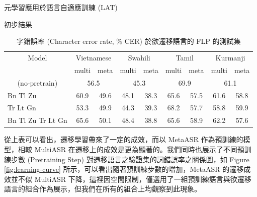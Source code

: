 \documentclass[12pt,UTF8,fntef]{article}
\begin{document}
\begin{section}{元學習應用於語言自適應訓練 (LAT)}
    \begin{subsection}{初步結果}
      \begin{table}[thp!]
\centering
\caption{字錯誤率 (Character error rate, \si{\percent} CER) 於欲遷移語言的 FLP 的測試集}
\label{tab:flp-table}
\begin{tabular}{@{}ccccccccc@{}}
\toprule
Model                                    & \multicolumn{2}{c}{Vietnamese}                         & \multicolumn{2}{c}{Swahili}                        & \multicolumn{2}{c}{Tamil}                        & \multicolumn{2}{c}{Kurmanji} \\

                                         & multi           & meta                                & multi           & meta                                & multi           & meta                                & multi           & meta           \\ \midrule
\multicolumn{1}{c|}{(no-pretrain)}                   & \multicolumn{2}{c|}{56.5}                    & \multicolumn{2}{c|}{45.3}                    & \multicolumn{2}{c|}{69.9}          & \multicolumn{2}{c}{61.1}                    \\

\multicolumn{1}{l|}{Bn Tl Zu}   &    60.9      & \multicolumn{1}{c|}{49.6}          & 48.1          & \multicolumn{1}{c|}{38.3}          & 65.6          & \multicolumn{1}{c|}{57.5}          & 61.6          & 58.8          \\
\multicolumn{1}{l|}{ \qquad \qquad Tr Lt Gn} & 53.3          & \multicolumn{1}{c|}{49.9}          & 44.3          & \multicolumn{1}{c|}{39.3}          & 68.2          & \multicolumn{1}{c|}{57.7}          & 58.8          & 59.9          \\
\multicolumn{1}{l|}{Bn Tl Zu Tr Lt Gn}           & 65.6          & \multicolumn{1}{c|}{50.1}          & 48.4          & \multicolumn{1}{c|}{38.8}          & 65.6          & \multicolumn{1}{c|}{58.9}          & 62.2          & 57.6          \\ \bottomrule
\end{tabular}
\end{table}

從上表可以看出，遷移學習帶來了一定的成效，而以 MetaASR 作為預訓練的模型，相較 MultiASR 在遷移上的成效是更為顯著的。我們同時也展示了不同預訓練步數 (Pretraining Step) 對遷移語言之驗證集的詞錯誤率之關係圖，如 Figure \ref{fig:learning-curve} 所示，可以看出隨著預訓練步數的增加，MetaASR 的遷移成效並不似 MultiASR 下降，這裡因空間限制，僅選用了一組預訓練語言與欲遷移語言的組合作為展示，但我們在所有的組合上均觀察到此現象。


\end{subsection}
\end{section}
\end{document}
